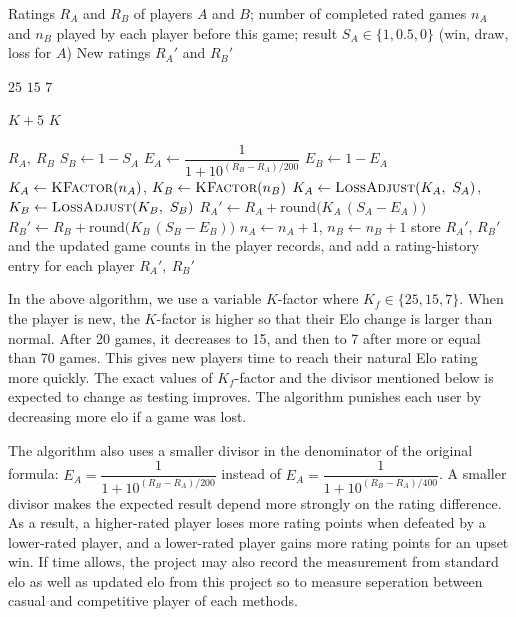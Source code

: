\begin{algorithm}[H]
\caption{Elo Rating Update After a Completed Game}
\label{alg:elo}
\begin{algorithmic}[1]
\Require Ratings $R_A$ and $R_B$ of players $A$ and $B$; number of completed rated games
     $n_A$ and $n_B$ played by each player before this game; result $S_A \in \{1, 0.5, 0\}$
     (win, draw, loss for $A$)
\Ensure New ratings $R_A'$ and $R_B'$

    \State \Return $25$ 
    \State \Return $15$ 
  \Else
    \State \Return $7$ 
  \EndIf
\EndFunction

    \State \Return $K + 5$ 
  \Else
    \State \Return $K$ 
  \EndIf
\EndFunction

  \State \Return $R_A,\ R_B$ 
\EndIf
\State $S_B \gets 1 - S_A$
\State $E_A \gets \dfrac{1}{1 + 10^{(R_B - R_A)/200}}$ 
\State $E_B \gets 1 - E_A$ 
\State $K_A \gets \Call{KFactor}{n_A}$, \quad $K_B \gets \Call{KFactor}{n_B}$
\State $K_A \gets \Call{LossAdjust}{K_A,\ S_A}$, \quad $K_B \gets \Call{LossAdjust}{K_B,\ S_B}$
\State $R_A' \gets R_A + \text{round}\big(K_A\,(S_A - E_A)\big)$
\State $R_B' \gets R_B + \text{round}\big(K_B\,(S_B - E_B)\big)$
\State $n_A \gets n_A + 1$, \quad $n_B \gets n_B + 1$
\State store $R_A'$, $R_B'$ and the updated game counts in the player records,
  and add a rating-history entry for each player
\State \Return $R_A',\ R_B'$
\end{algorithmic}
\end{algorithm}

In the above algorithm, we use a variable $K$-factor where
$K_f \in \{25,15,7\}$. When the player is new, the $K$-factor is
higher so that their Elo change is larger than normal. After 20 games,
it decreases to 15, and then to 7 after more or equal than 70 games. This gives
new players time to reach their natural Elo rating more quickly. The exact values of $K_f$-factor and the divisor mentioned below is expected to change as testing improves. The algorithm punishes each user by decreasing more elo if a game was lost.

The algorithm also uses a smaller divisor in the denominator of the original formula: $E_A = \dfrac{1}{1 + 10^{(R_B - R_A)/200}}$ instead of $E_A = \dfrac{1}{1 + 10^{(R_B - R_A)/400}}$. A smaller divisor makes the expected result depend more strongly on the rating difference. As a result, a higher-rated player loses more rating points when defeated by a lower-rated player, and a lower-rated player gains more rating points for an upset win. If time allows, the project may also record the measurement from standard elo as well as updated elo from this project so to measure seperation between casual and competitive player of each methods.

